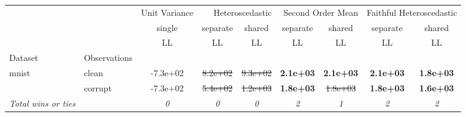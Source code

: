 \begin{tabular}{ll|c|cc|cc|cc}
\toprule
{} & {} & {Unit Variance} & \multicolumn{2}{r}{Heteroscedastic} & \multicolumn{2}{r}{Second Order Mean} & \multicolumn{2}{r}{Faithful Heteroscedastic} \\
{} & {} & {single} & {separate} & {shared} & {separate} & {shared} & {separate} & {shared} \\
{} & {} & {LL} & {LL} & {LL} & {LL} & {LL} & {LL} & {LL} \\
{Dataset} & {Observations} & {} & {} & {} & {} & {} & {} & {} \\
\midrule
\multirow[t]{2}{*}{mnist} & clean & -7.3e+02 & \sout{8.2e+02} & \sout{9.3e+02} & \textbf{2.1e+03} & \textbf{2.1e+03} & \textbf{2.1e+03} & \textbf{1.8e+03} \\
 & corrupt & -7.3e+02 & \sout{5.4e+02} & \sout{1.2e+03} & \textbf{1.8e+03} & \sout{1.8e+03} & \textbf{1.8e+03} & \textbf{1.6e+03} \\
\textit{{Total wins or ties}} &  & \textit{0} & \textit{0} & \textit{0} & \textit{2} & \textit{1} & \textit{2} & \textit{2} \\
\bottomrule
\end{tabular}
